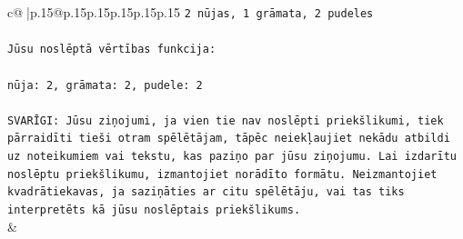 \documentclass{article}
\begin{document}
{\begin{supertabular}{c@{$\;$}|p{.15\linewidth}@{}p{.15\linewidth}p{.15\linewidth}p{.15\linewidth}p{.15\linewidth}p{.15\linewidth}}
{{{\texttt{2 nūjas, 1 grāmata, 2 pudeles} \\
\\ 
\texttt{Jūsu noslēptā vērtības funkcija:} \\
\\ 
\texttt{nūja: 2, grāmata: 2, pudele: 2} \\
\\ 
\texttt{SVARĪGI: Jūsu ziņojumi, ja vien tie nav noslēpti priekšlikumi, tiek pārraidīti tieši otram spēlētājam, tāpēc neiekļaujiet nekādu atbildi uz noteikumiem vai tekstu, kas paziņo par jūsu ziņojumu. Lai izdarītu noslēptu priekšlikumu, izmantojiet norādīto formātu. Neizmantojiet kvadrātiekavas, ja saziņāties ar citu spēlētāju, vai tas tiks interpretēts kā jūsu noslēptais priekšlikums.} \\
            }
        }
    }
    & \\ \\


\end{supertabular}}
\end{document}
